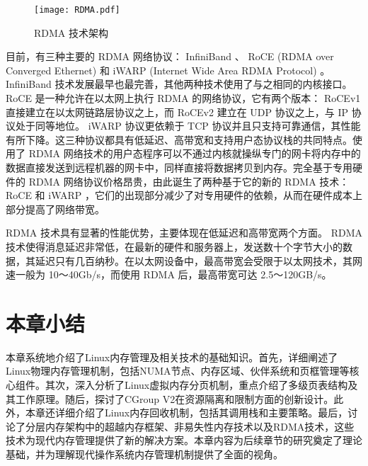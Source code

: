 \begin{figure}[h]
    \centering
    \texttt{[image: RDMA.pdf]}
    \caption{RDMA 技术架构}
    \label{fig:RDMA}
\end{figure}

目前，有三种主要的 RDMA 网络协议： InfiniBand 、 RoCE (RDMA over Converged Ethernet) 和 iWARP (Internet Wide Area RDMA Protocol) 。 InfiniBand 技术发展最早也最完善，其他两种技术使用了与之相同的内核接口。 RoCE 是一种允许在以太网上执行 RDMA 的网络协议，它有两个版本： RoCEv1 直接建立在以太网链路层协议之上，而 RoCEv2 建立在 UDP 协议之上，与 IP 协议处于同等地位。 iWARP 协议更依赖于 TCP 协议并且只支持可靠通信，其性能有所下降。这三种协议都具有低延迟、高带宽和支持用户态协议栈的共同特点。使用了 RDMA 网络技术的用户态程序可以不通过内核就操纵专门的网卡将内存中的数据直接发送到远程机器的网卡中，同样直接将数据拷贝到内存。完全基于专用硬件的 RDMA 网络协议价格昂贵，由此诞生了两种基于它的新的 RDMA 技术： RoCE 和 iWARP ，它们的出现部分减少了对专用硬件的依赖，从而在硬件成本上部分提高了网络带宽。

 RDMA 技术具有显著的性能优势，主要体现在低延迟和高带宽两个方面。 RDMA 技术使得消息延迟非常低，在最新的硬件和服务器上，发送数十个字节大小的数据，其延迟只有几百纳秒。在以太网设备中，最高带宽会受限于以太网技术，其网速一般为 10～40Gb/s，而使用 RDMA 后，最高带宽可达 2.5～120GB/s。

\section{本章小结}

本章系统地介绍了Linux内存管理及相关技术的基础知识。首先，详细阐述了Linux物理内存管理机制，包括NUMA节点、内存区域、伙伴系统和页框管理等核心组件。其次，深入分析了Linux虚拟内存分页机制，重点介绍了多级页表结构及其工作原理。随后，探讨了CGroup V2在资源隔离和限制方面的创新设计。此外，本章还详细介绍了Linux内存回收机制，包括其调用栈和主要策略。最后，讨论了分层内存架构中的超越内存框架、非易失性内存技术以及RDMA技术，这些技术为现代内存管理提供了新的解决方案。本章内容为后续章节的研究奠定了理论基础，并为理解现代操作系统内存管理机制提供了全面的视角。